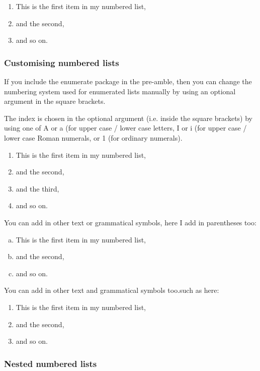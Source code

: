 \documentclass[a4paper,11pt]{article}
\begin{document}
\begin{enumerate}
\item This is the first item in my numbered list,
\item and the second,
\item and so on.
\end{enumerate}

\subsubsection{Customising numbered lists}
If you include the enumerate package in the pre-amble, then you can change the numbering system used for enumerated lists manually by using an optional argument in the square brackets.

The index is chosen in the optional argument (i.e. inside the square brackets) by using one of  A or a (for upper case / lower case letters,  I or i (for upper case / lower case Roman numerals, or 1 (for ordinary numerals).

\begin{enumerate}[I] %
\item This is the first item in my numbered list,
\item and the second,
\item and the third,
\item and so on.
\end{enumerate}

You can add in other text or grammatical symbols, here I add in parentheses too:
\begin{enumerate}[(a)] %
\item This is the first item in my numbered list,
\item and the second,
\item and so on.
\end{enumerate}

You can add in other text and grammatical symbols too.such as here:
\begin{enumerate}[Step 1:] %
\item This is the first item in my numbered list,
\item and the second,
\item and so on.
\end{enumerate}

\subsubsection{Nested numbered lists}
\end{document}
